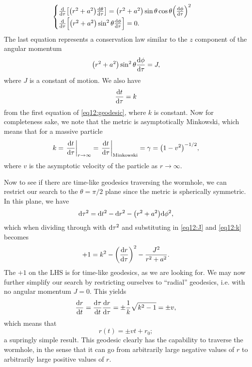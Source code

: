 \documentclass[11pt,a4paper, 
swedish, english %
]{article}
\begin{document}
\begin{equation}
\begin{cases}
\dv{\tau}\qty[\qty(r^2+a^2)\dv{\theta}{\tau}]
=\qty(r^2+a^2)\sin\theta\cos\theta\qty(\dv{\phi}{\tau})^2\\[0.5ex]
\dv{\tau}\qty[\qty(r^2+a^2)\sin^2\theta\dv{\phi}{\tau}]=0.
\end{cases}
\end{equation}
The last equation represents a conservation law similar to the $z$
component of the angular momentum
\begin{equation}\label{eq12:J}
\qty(r^2+a^2)\sin^2\theta\dv{\phi}{\tau}=J,
\end{equation}
where $J$ is a constant of motion. We also have
\begin{equation}\label{eq12:k}
\dv{t}{\tau}=k
\end{equation}
from the first equation of \eqref{eq12:geodesic}, where $k$ is
constant. Now for completeness sake, we note that the metric is
asymptotically Minkowski, which means that for a massive particle
\begin{equation}
k=\eval{\dv{t}{\tau}}_{r\to\infty}=
\eval{\dv{t}{\tau}}_{\text{Minkowski}}=\gamma=\qty(1-v^2)^{-1/2},
\end{equation}
where $v$ is the asymptotic velocity of the particle as $r\to\infty$.

Now to see if there are time-like geodesics traversing the wormhole,
we can restrict our search to the $\theta=\pi/2$ plane since the
metric is spherically symmetric. In this plane, we have
\begin{equation}
\mathrm{d}\tau^2=\mathrm{d}{t}^2-\mathrm{d}{r}^2-\qty(r^2+a^2)\mathrm{d}{\phi}^2,
\end{equation}
which when dividing through with $\mathrm{d}\tau^2$ and substituting in
\eqref{eq12:J} and \eqref{eq12:k} becomes
\begin{equation}
+1=k^{2}-\qty(\dv{r}{\tau})^2-\frac{J^2}{r^2+a^2}.
\end{equation}
The $+1$ on the LHS is for time-like geodesics, as we are looking
for. We may now further simplify our search by restricting ourselves
to ``radial'' geodesics, i.e. with no angular momentum $J=0$. This
yields
\begin{equation}
\dv{r}{t}=\dv{\tau}{t}\dv{r}{\tau}=\pm\frac{1}{k}\sqrt{k^2-1}
=\pm v,
\end{equation}
which means that
\begin{equation}
r(t)=\pm vt+r_0;
\end{equation}
a supringly simple result.
This geodesic clearly has the capability to traverse the wormhole, in
the sense that it can go from arbitrarily large negative values of $r$
to arbitrarily large positive values of $r$. 
\end{document}
